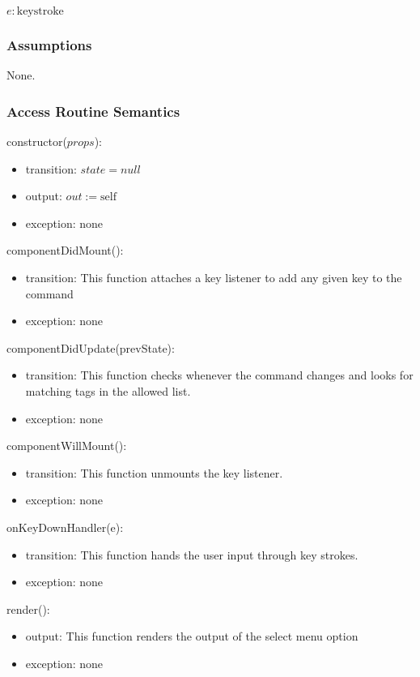 \documentclass[12pt, titlepage]{article}
\begin{document}
$\mathit{e}: \text{keystroke}$

\subsubsection{Assumptions}

None.

\subsubsection{Access Routine Semantics}

\noindent constructor($props$):
\begin{itemize}
\item transition: $\mathit{state} = null $
\item output: $out := \mbox{self}$
\item exception: none
\end{itemize}

\noindent componentDidMount():
\begin{itemize}
\item transition: This function attaches a key listener to add any given key to the command
\item exception: none
\end{itemize}

\noindent componentDidUpdate(prevState):
\begin{itemize}
\item transition: This function checks whenever the command changes and looks for matching tags in the allowed list.
\item exception: none
\end{itemize}

\noindent componentWillMount():
\begin{itemize}
\item transition: This function unmounts the key listener.
\item exception: none
\end{itemize}

\noindent onKeyDownHandler(e):
\begin{itemize}
\item transition: This function hands the user input through key strokes.
\item exception: none
\end{itemize}

\noindent render():
\begin{itemize}
\item output: This function renders the output of the select menu option
\item exception: none
\end{itemize}
\end{document}
